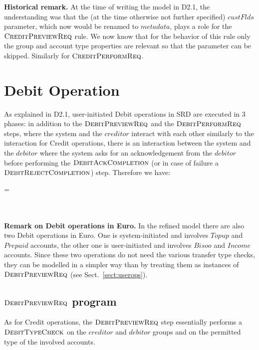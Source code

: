 {\bf Historical remark.} At the time of writing the model in D2.1, the understanding was that the (at the time otherwise not further specified) $custFlds$ parameter, which now would be renamed to $metadata$, plays a role for the $\hbox{\sc CreditPreviewReq}$ rule. We now know that for the behavior of this rule only the group and account type properties are relevant so that the parameter can be skipped. Similarly for $\hbox{\sc CreditPerformReq}$.




\section{Debit Operation} 
\label{sect:debitops}

As explained in D2.1, user-initiated Debit operations in SRD are executed in 3 phases: in addition to the $\hbox{\sc DebitPreviewReq}$ and the $\hbox{\sc DebitPerformReq}$ steps, where the system and the $creditor$ interact with each other similarly to the interaction for Credit operations, there is an interaction between the system and the $debitor$ where the system asks for an acknowledgement from the $debitor$ before performing the $\hbox{\sc DebitAckCompletion}$ (or in case of failure a $\hbox{\sc DebitRejectCompletion}$) step. Therefore we have:

\begin{asm}
=\+
    \\
    \\
   \\
\end{asm}

{\bf Remark on Debit operations in Euro.} In the refined model there are also two Debit operations in Euro. One is system-initiated and involves $Topup$ and $Prepaid$ accounts, the other one is user-initiated  and involves $Bisoo$ and $Income$ accounts. Since these two operations do not need the various transfer type checks, they can be modelled in a simpler way than by treating them as instances of $\hbox{\sc DebitPreviewReq}$ (see Sect.~\ref{sect:userops}).

\subsection{$\hbox{\sc DebitPreviewReq}$ program}
\label{sect:debitpreview}

As for Credit operations, the $\hbox{\sc DebitPreviewReq}$ step essentially performs a $\hbox{\sc DebitTypeCheck}$ on the $creditor$ and $debitor$ groups and on the permitted type of the involved accounts. 

